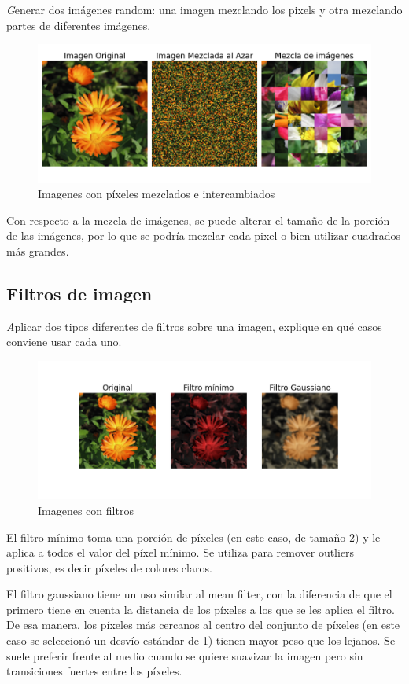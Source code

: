 \documentclass{article}
\begin{document}
{\emph Generar dos imágenes random: una imagen mezclando los pixels y otra mezclando
partes de diferentes imágenes.}

\begin{figure}[h!]
  \centering    
  \includegraphics[width=.75\textwidth]{5_mezcla.png}
  \caption{Imagenes con píxeles mezclados e intercambiados}
\end{figure}

Con respecto a la mezcla de imágenes, se puede alterar el tamaño de la porción
de las imágenes, por lo que se podría mezclar cada pixel o bien utilizar
cuadrados más grandes.

\subsection{Filtros de imagen}

{\emph Aplicar dos tipos diferentes de filtros sobre una imagen, 
explique en qué casos conviene usar cada uno.}
\begin{figure}[h!]
  \centering    
  \includegraphics[width=1\textwidth]{6_filtro.png}
  \caption{Imagenes con filtros}
\end{figure}

El filtro mínimo toma una porción de píxeles (en este caso, de tamaño 2) y 
le aplica a todos el valor del píxel mínimo. Se utiliza para remover 
outliers positivos, es decir píxeles de colores claros.

El filtro gaussiano tiene un uso similar al mean filter, con la
diferencia de que el primero tiene en cuenta la distancia de los 
píxeles a los que se les aplica el filtro. De esa manera, los píxeles
más cercanos al centro del conjunto de píxeles (en este caso se seleccionó un
desvío estándar de 1) tienen mayor peso que los lejanos. Se suele preferir
frente al medio cuando se quiere suavizar la imagen pero sin transiciones
fuertes entre los píxeles.
\end{document}
